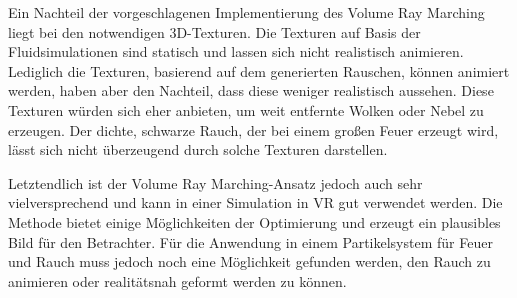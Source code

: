 Ein Nachteil der vorgeschlagenen Implementierung des Volume Ray Marching liegt bei den notwendigen 3D-Texturen. 
Die Texturen auf Basis der Fluidsimulationen sind statisch und lassen sich nicht realistisch animieren. Lediglich die Texturen, basierend auf dem
generierten Rauschen, können animiert werden, haben aber den Nachteil, dass diese weniger realistisch aussehen. Diese Texturen würden sich eher anbieten,
um weit entfernte Wolken oder Nebel zu erzeugen. Der dichte, schwarze Rauch, der bei einem großen Feuer erzeugt wird, lässt sich nicht überzeugend 
durch solche Texturen darstellen. 

Letztendlich ist der Volume Ray Marching-Ansatz jedoch auch sehr vielversprechend und kann in einer Simulation in VR gut verwendet werden. 
Die Methode bietet einige Möglichkeiten der Optimierung und erzeugt ein plausibles Bild für den Betrachter. 
Für die Anwendung in einem Partikelsystem für Feuer und Rauch muss jedoch noch eine Möglichkeit gefunden werden, den Rauch zu animieren oder 
realitätsnah geformt werden zu können. 



